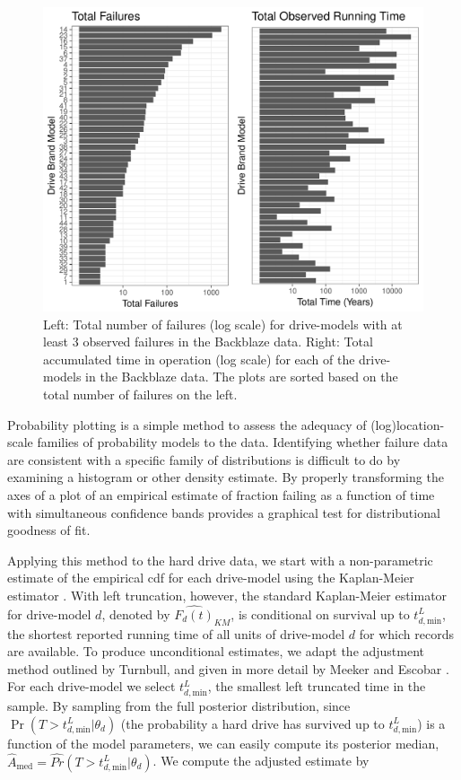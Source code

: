 \documentclass[12pt]{article}
\begin{document}
\begin{figure}[H]
  \includegraphics[width=.9\textwidth]{fig/data-sum.pdf}
  \caption{Left: Total number of failures (log scale) for drive-models with at least 3 observed failures in the Backblaze data. Right: Total accumulated time in operation (log scale) for each of the drive-models in the Backblaze data.  The plots are sorted based on the total number of failures on the left.}
  \label{fig1}
\end{figure}


Probability plotting is a simple method to assess the adequacy of (log)location-scale families of probability models to the data.  Identifying whether failure data are consistent with a specific family of distributions is difficult to do by examining a histogram or other density estimate.  By properly transforming the axes of a plot of an empirical estimate of fraction failing as a function of time with simultaneous confidence bands provides a graphical test for distributional goodness of fit.  

Applying this method to the hard drive data, we start with a non-parametric estimate of the empirical cdf for each drive-model using the Kaplan-Meier estimator
\cite{kaplan}.  With left truncation, however, the standard Kaplan-Meier estimator for drive-model $d$, denoted by
$\widehat{F_d(t)}_{KM}$, is conditional on survival up to
$t_{d,\text{min}}^L$, the shortest reported running time of all units
of drive-model $d$ for which records are available. To produce
unconditional estimates, we adapt the adjustment method outlined by
Turnbull, and given in more detail by Meeker and Escobar
\cite{turnbull,meeker}.  For each drive-model we select
$t_{d,\text{min}}^L$, the smallest left truncated time in the sample.
By sampling from the full posterior distribution, since
$\Pr(T>t_{d,\text{min}}^L|\theta_d)$ (the probability a hard drive has
survived up to $t_{d,\text{min}}^L$) is a function of the model
parameters, we can easily compute its posterior median,
$\widehat{A}_{\text{med}} = \widehat{Pr}(T>t_{d,\text{min}}^L|\theta_d)$. We compute the adjusted estimate by
\end{document}
